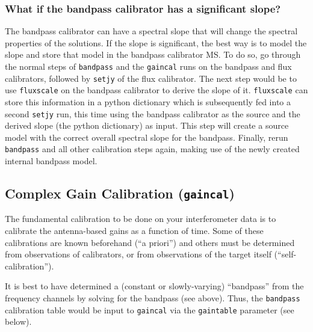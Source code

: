 \subsubsection{What if the bandpass calibrator has a significant slope?}
The bandpass calibrator can have a spectral slope that will change the
spectral properties of the solutions. If the slope is significant, the
best way is to model the slope and store that model in the bandpass
calibrator MS. To do so, go through the normal steps of {\tt bandpass}
and the {\tt gaincal} runs on the bandpass and flux calibrators,
followed by {\tt setjy} of the flux calibrator. The next step would be
to use {\tt fluxscale} on the bandpass calibrator to derive the slope
of it. {\tt fluxscale} can store this information in a python
dictionary which is subsequently fed into a second {\tt setjy} run,
this time using the bandpass calibrator as the source and the derived
slope (the python dictionary) as input. This step will
create a source model with the correct overall spectral slope for the
bandpass. Finally, rerun {\tt bandpass} and all other
calibration steps again, making use of the newly created internal
bandpass model.


\subsection{Complex Gain Calibration ({\tt gaincal})}
\label{section:cal.solve.gain}

The fundamental calibration to be done on your interferometer data
is to calibrate the antenna-based gains as a function of time. Some of
these calibrations are known beforehand (``a priori'') and others
must be determined from observations of calibrators, or from observations
of the target itself (``self-calibration'').

It is best to have determined a (constant or slowly-varying) ``bandpass'' from the
frequency channels by solving for the bandpass (see above).  Thus,
the {\tt bandpass} calibration table would be input to {\tt gaincal} via
the {\tt gaintable} parameter (see below).

